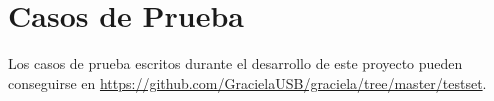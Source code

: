 \chapter{Casos de Prueba}
\label{testset}

Los casos de prueba escritos durante el desarrollo de este proyecto pueden conseguirse en \url{https://github.com/GracielaUSB/graciela/tree/master/testset}. 
